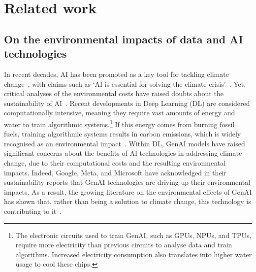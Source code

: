 \section{Related work}
\subsection{On the environmental impacts of data and AI technologies}

In recent decades, AI has been promoted as a key tool for tackling climate change~\cite{cowls2023ai_gambit, coeckelbergh2021ai_climate}, with claims such as `AI is essential for solving the climate crisis'~\cite{Maher2022}. Yet, critical analyses of the environmental costs have raised doubts about the sustainability of AI~\cite{dobbe2019ai_climate, brevini2021ai, VanWynsberghe2021}.  Recent developments in Deep Learning (DL) are considered computationally intensive, meaning they require vast amounts of energy and water to train algorithmic systems.\footnote{The electronic circuits used to train GenAI, such as GPUs, NPUs, and TPUs, require more electricity than previous circuits to analyse data and train algorithms. Increased electricity consumption also translates into higher water usage to cool these chips.} If this energy comes from burning fossil fuels, training algorithmic systems results in carbon emissions, which is widely recognised as an environmental impact~\cite{hogan2024fumes, Luccioni2023}. Within DL, GenAI models have raised significant concerns about the benefits of AI technologies in addressing climate change, due to their computational costs and the resulting environmental impacts. Indeed, Google, Meta, and Microsoft have acknowledged in their sustainability reports that GenAI technologies are driving up their environmental impacts. As a result, the growing literature on the environmental effects of GenAI has shown that, rather than being a solution to climate change, this technology is contributing to it~\cite{crawford2024generative_ai, Stein2024, brevini2021ai, Lehuedé2024, hogan2015data, brodie2023data, Kneese2024}.

